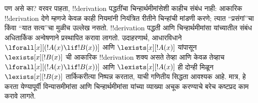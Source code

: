 \documentclass[../../../include/open-logic-section]{subfiles}
\begin{document}
पण असे का? वरवर पाहता, !!{derivation} पद्धतींचा चिन्हार्थमीमांसेशी
काहीच संबंध नाही: आकारिक !!{derivation} देणे म्हणजे केवळ काही
नियमांनी नियंत्रित रीतीने चिन्हांची मांडणी करणे; त्यात ``प्रसंगां''चा
किंवा ``यात सत्य''चा मुळीच उल्लेख नसतो. !!{derivation} पद्धती आणि
चिन्हार्थमीमांसा यांच्यातील संबंध अधितार्किक अन्वेषणाने प्रस्थापित
करावा लागतो. उदाहरणार्थ, आधारविधाने
$\lforall[x][(!A(x) \lif !B(x))]$ आणि $\lexists[x][!A(x)]$ यांपासून
$\lexists[x][!B(x)]$ ची आकारिक !!{derivation} शक्य असते तेव्हा आणि
केवळ तेव्हाच $\lforall[x][(!A(x) \lif !B(x))]$ आणि
$\lexists[x][!A(x)]$ ही दोन्ही मिळून
$\lexists[x][!B(x)]$ तार्किकरीत्या निष्पन्न करतात, याची गणितीय
सिद्धता आवश्यक आहे. मात्र, हे करता येण्यापूर्वी विन्यासमीमांसा आणि
चिन्हार्थमीमांसा यांच्या व्याख्या अचूक करण्याचे बरेच कष्टप्रद काम
करावे लागते.
\end{document}
